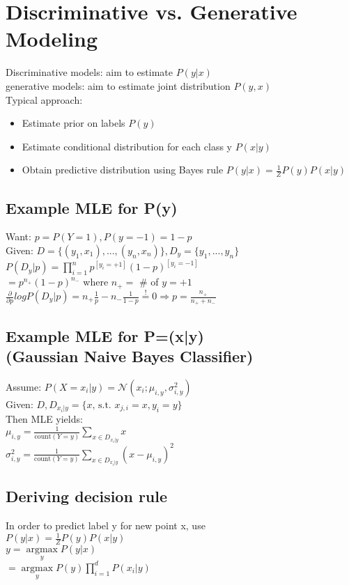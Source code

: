 \section*{Discriminative vs. Generative Modeling}
Discriminative models: aim to estimate $P(y|x)$\\
generative models:  aim to estimate joint distribution $P(y,x)$\\

Typical approach:
\begin{itemize}
	\item Estimate prior on labels $P(y)$
	\item Estimate conditional distribution for each class y $P(x|y)$
	\item Obtain predictive distribution using Bayes rule $P(y|x) = \frac{1}{Z} P(y) P(x|y)$
\end{itemize}

\subsection*{Example MLE for P(y)}
Want: $p = P(Y=1), P(y=-1) = 1-p$\\
Given: $D=\{(y_1,x_1),...,(y_n,x_n)\}, D_y=\{y_1,...,y_n\}$\\
$P(D_y|p) = \prod_{i=1}^n p^{[y_i=+1]} (1-p)^{[y_i=-1]}$\\
$=p^{n_+} (1-p)^{n_-}$ where $n_+ = $ \# of $y=+1$\\
$\frac{\partial}{\partial p} log P(D_y|p) = n_+ \frac{1}{p} - n_- \frac{1}{1-p} \overset{!}{=} 0 \Rightarrow p=\frac{n_+}{n_+ + n_-}$

\subsection*{Example MLE for P=(x|y) \\ (Gaussian Naive Bayes Classifier)}
Assume: $P(X=x_i|y) = \mathcal{N}(x_i;\mu_{i,y}, \sigma_{i,y}^2)$\\
Given: $D, D_{x_i|y} = \{x \text{, s.t. } x_{j,i}=x, y_i=y\}$\\
Then MLE yields:\\
$\mu_{i,y} = \frac{1}{\text{count}(Y=y)} \sum_{x\in D_{x_i|y}} x$\\
$\sigma_{i,y}^2 = \frac{1}{\text{count}(Y=y)} \sum_{x\in D_{x_i|y}} (x-\mu_{i,y})^2$

\subsection*{Deriving decision rule}
In order to predict label y for new point x, use\\
$P(y|x) = \frac{1}{Z} P(y)P(x|y)$\\
$y = \underset{y}{\operatorname{argmax}} P(y|x)$\\
$= \underset{y}{\operatorname{argmax}} P(y) \prod_{i=1}^d P(x_i|y)$\\

